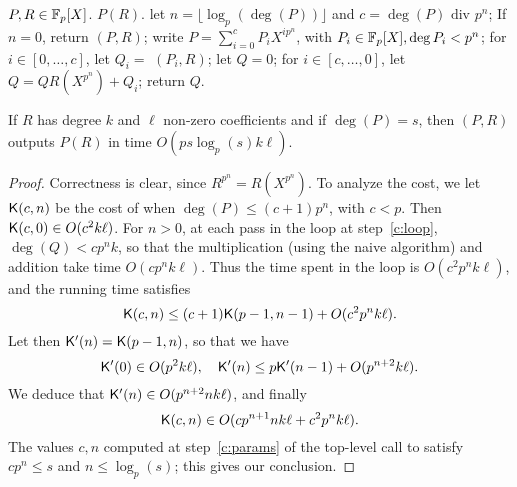 \begin{algorithm}
  \caption{}
  \label{alg:compose}
  \begin{algorithmic}[1]
    \REQUIRE $P,R\in\mathbb{F}_p[X]$.
    \ENSURE $P(R)$.
    \STATE\label{c:params} let $n=\lfloor \log_p(\deg(P)) \rfloor$ and $c=\deg(P) \text{ div } p^n$;
    \STATE If $n=0$, return $(P,R)$;
    \STATE write $P=\sum_{i=0}^{c} P_i X^{ip^n}$, with $P_i \in \mathbb{F}_p[X], \deg P_i<p^n$;
    \STATE for $i\in [0,\dots,c]$, let $Q_i =$ $(P_i,R)$;
    \STATE let $Q=0$;
    \STATE\label{c:loop} for $i\in [c,\dots,0]$, let $Q = Q R(X^{p^n})  + Q_i$;
    \STATE return $Q$.
  \end{algorithmic}
\end{algorithm}


\begin{theorem}
  \label{theo:comp}
  If $R$ has degree $k$ and $\ell$ non-zero coefficients and if
  $\deg(P)=s$, then $(P,R)$ outputs $P(R)$ in
  time $O(ps \log_p(s)k\ell)$.
\end{theorem}
\begin{proof}
  Correctness is clear, since $R^{p^n}=R(X^{p^n})$. To analyze the
  cost, we let $\mathsf{K}(c,n)$ be the cost of  when
  $\deg(P)\le (c+1)p^n$, with $c<p$. Then $\mathsf{K}(c,0) \in O(c^2k\ell)$.
  For $n > 0$, at each pass in the loop at step~\ref{c:loop}, $\deg(Q)
  < cp^n k$, so that the multiplication (using the naive algorithm)
  and addition take time $O(cp^nk\ell)$. Thus the time spent in the
  loop is $O(c^2p^{n}k\ell)$, and the running time
  satisfies
  \begin{equation}
    \label{eq:70}
    \mathsf{K}(c,n) \le (c+1)\mathsf{K}(p-1,n-1) + O(c^2p^nk\ell)
    \text{.}    
  \end{equation}
  Let then $\mathsf{K}'(n)=\mathsf{K}(p-1,n)$, so that we have
  \begin{equation}
    \label{eq:71}
    \mathsf{K}'(0) \in O(p^2k\ell), \quad \mathsf{K}'(n) \le p\mathsf{K}'(n-1) +
    O(p^{n+2}k\ell)
    \text{.}  
  \end{equation}
  We deduce that $\mathsf{K}'(n) \in O(p^{n+2}nk\ell)$,
  and finally
  \begin{equation}
    \label{eq:72}
    \mathsf{K}(c,n) \in O(cp^{n+1}nk\ell + c^2p^nk\ell)
    \text{.}  
  \end{equation}
  The values $c,n$ computed at step~\ref{c:params} of the top-level
  call to  satisfy $cp^n\le s$ and $n\le\log_p (s)$; this
  gives our conclusion.
\end{proof}

